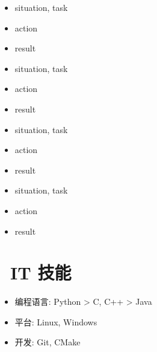 \documentclass{resume}
\begin{document}
\begin{onehalfspacing}
\begin{itemize}
  \item situation, task
  \item action
  \item result
\end{itemize}
\end{onehalfspacing}

\begin{onehalfspacing}
\begin{itemize}
  \item situation, task
  \item action
  \item result
\end{itemize}
\end{onehalfspacing}

\begin{onehalfspacing}
\begin{itemize}
  \item situation, task
  \item action
  \item result
\end{itemize}
\end{onehalfspacing}

\begin{onehalfspacing}
\begin{itemize}
  \item situation, task
  \item action
  \item result
\end{itemize}
\end{onehalfspacing}


\section{\faCogs\ IT 技能}
\begin{itemize}[parsep=0.5ex]
  \item 编程语言: Python > C, C++ > Java
  \item 平台: Linux, Windows
  \item 开发: Git, CMake
\end{itemize}
\end{document}

